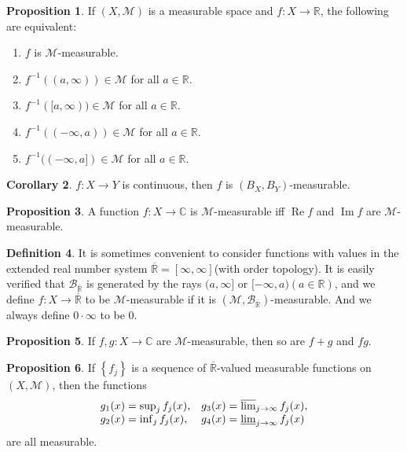 \documentclass[12pt,a4paper]{book}
\newenvironment{enu}{\begin{enumerate}[(1)]}{\end{enumerate}}
\theoremstyle{definition}
\newtheorem{defn}{Definition}[section]
\newtheorem{coro}[defn]{Corollary}
\newtheorem{prop}[defn]{Proposition}
\begin{document}
\begin{prop}
    If $(X, \mathcal{M})$ is a measurable space and $f: X \rightarrow \mathbb{R}$, the following are equivalent:
    \begin{enu}
        \item $f$ is $\mathcal{M}$-measurable.
        \item $f^{-1}((a, \infty)) \in \mathcal{M}$ for all $a \in \mathbb{R}$.
        \item $f^{-1}([a, \infty)) \in \mathcal{M}$ for all $a \in \mathbb{R}$.
                        \item $f^{-1}((-\infty, a)) \in \mathcal{M}$ for all $a \in \mathbb{R}$.
                        \item $f^{-1}((-\infty, a]) \in \mathcal{M}$ for all $a \in \mathbb{R}$.
    \end{enu}
\end{prop}
\begin{coro}
    $f:X\rightarrow Y$ is continuous, then $f$ is $(B_X,B_Y)$-measurable.
\end{coro}
\begin{prop}
    A function $f: X \rightarrow \mathbb{C}$ is $\mathcal{M}$-measurable iff $\operatorname{Re} f$ and $\operatorname{Im} f$ are $\mathcal{M}$-measurable.
\end{prop}
\begin{defn}
    It is sometimes convenient to consider functions with values in the extended real number system $\overline{\mathbb{R}}=[\infty, \infty]$(with order topology).
    It is easily verified that $\mathcal{B}_{\overline{\mathbb{R}}}$ is generated by the rays $(a, \infty]$ or $[-\infty, a)(a \in \mathbb{R})$, and
    we define $f: X \rightarrow \overline{\mathbb{R}}$ to be $\mathcal{M}$-measurable if it is $\left(\mathcal{M}, \mathcal{B}_{\overline{\mathbb{R}}}\right)$-measurable.
    And we always define $0 \cdot \infty$ to be 0.
\end{defn}
\begin{prop}
    If $f, g: X \rightarrow \mathbb{C}$ are $\mathcal{M}$-measurable, then so are $f+g$ and $f g$.
\end{prop}
\begin{prop}
    If $\left\{f_j\right\}$ is a sequence of $\overline{\mathbb{R}}$-valued measurable functions on $(X, \mathcal{M})$, then the functions
    $$
        \begin{array}{ll}
            g_1(x)=\sup _j f_j(x), & g_3(x)=\varlimsup_{j\to \infty}  f_j(x), \\
            g_2(x)=\inf _j f_j(x), & g_4(x)=\varliminf_{j\to \infty} f_j(x)
        \end{array}
    $$
    are all measurable.
\end{prop}
\end{document}
